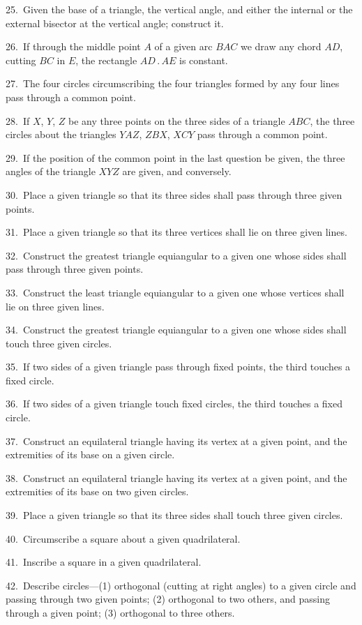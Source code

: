 \documentclass[oneside]{book}
\begin{document}
\begin{footnotesize}
25.~Given the base of a triangle, the vertical angle, and either
the internal or the external bisector at the vertical angle; construct
it.

26.~If through the middle point $A$ of a given arc $BAC$ we
draw any chord $AD$, cutting $BC$ in $E$, the rectangle $AD\,.\,AE$ is
constant.

27.~The four circles circumscribing the four triangles formed
by any four lines pass through a common point.

28.~If $X$, $Y$, $Z$ be any three points on the three sides of a triangle
$ABC$, the three circles about the triangles $YAZ$, $ZBX$, $XCY$
pass through a common point.

29.~If the position of the common point in the last question be
given, the three angles of the triangle $XYZ$ are given, and conversely.

30.~Place a given triangle so that its three sides shall pass
through three given points.

31.~Place a given triangle so that its three vertices shall lie on
three given lines.

32.~Construct the greatest triangle equiangular to a given one
whose sides shall pass through three given points.

33.~Construct the least triangle equiangular to a given one
whose vertices shall lie on three given lines.

34.~Construct the greatest triangle equiangular to a given one
whose sides shall touch three given circles.

35.~If two sides of a given triangle pass through fixed points,
the third touches a fixed circle.

36.~If two sides of a given triangle touch fixed circles, the
third touches a fixed circle.

37.~Construct an equilateral triangle having its vertex at a
given point, and the extremities of its base on a given circle.

38.~Construct an equilateral triangle having its vertex at a
given point, and the extremities of its base on two given circles.

39.~Place a given triangle so that its three sides shall touch
three given circles.

40.~Circumscribe a square about a given quadrilateral.

41.~Inscribe a square in a given quadrilateral.

42.~Describe circles---(1) orthogonal (cutting at right angles) to
a given circle and passing through two given points; (2) orthogonal
to two others, and passing through a given point; (3) orthogonal
to three others.


\end{footnotesize}
\end{document}
